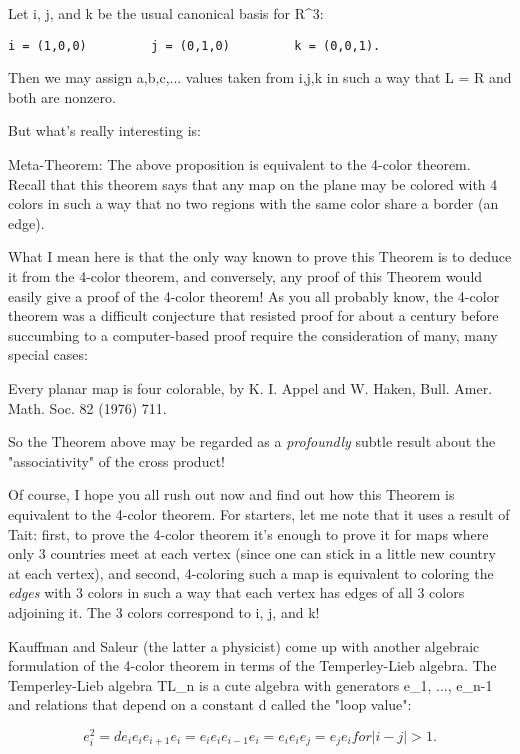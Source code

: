 Let i, j, and k be the usual canonical basis for R^3:

\begin{verbatim}
i = (1,0,0)         j = (0,1,0)         k = (0,0,1).
\end{verbatim}
    

Then we may assign a,b,c,... values taken from {i,j,k} in such a way 
that L = R and both are nonzero.

But what's really interesting is:

Meta-Theorem: The above proposition is equivalent to the 4-color
theorem.  Recall that this theorem says that any map on the plane may be
colored with 4 colors in such a way that no two regions with the same
color share a border (an edge).  

What I mean here is that the only way known to prove this Theorem is to
deduce it from the 4-color theorem, and conversely, any proof of this
Theorem would easily give a proof of the 4-color theorem!  As you all
probably know, the 4-color theorem was a difficult conjecture that
resisted proof for about a century before succumbing to a computer-based
proof require the consideration of many, many special cases:

Every planar map is four colorable, by K. I. Appel and W. Haken, Bull.
Amer. Math. Soc. 82 (1976) 711.

So the Theorem above may be regarded as a \emph{profoundly} subtle result
about the "associativity" of the cross product!

Of course, I hope you all rush out now and find out how this Theorem is
equivalent to the 4-color theorem.  For starters, let me note that it
uses a result of Tait: first, to prove the 4-color theorem it's enough
to prove it for maps where only 3 countries meet at each vertex (since
one can stick in a little new country at each vertex), and second,
4-coloring such a map is equivalent to coloring the \emph{edges} with 3
colors in such a way that each vertex has edges of all 3 colors
adjoining it.  The 3 colors correspond to i, j, and k!

Kauffman and Saleur (the latter a physicist) come up with another algebraic
formulation of the 4-color theorem in terms of the Temperley-Lieb
algebra.  The Temperley-Lieb algebra TL_n is a cute algebra with
generators e_1, ..., e_{n-1} and relations that depend on a constant d
called the "loop value":

$$
e_i^2 = de_i
e_i e_{i+1} e_i = e_i
e_i e_{i-1} e_i = e_i
e_i e_j = e_j e_i     for |i-j| > 1.
$$
    

